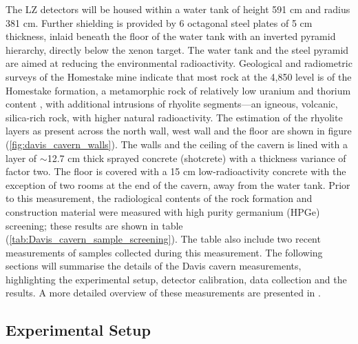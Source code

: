 The LZ detectors will be housed within a water tank of height 591 cm and radius 381 cm. Further shielding is provided by 6 octagonal steel plates of 5 cm thickness, inlaid beneath the floor of the water tank with an inverted pyramid hierarchy, directly below the xenon target. The water tank and the steel pyramid are aimed at reducing the environmental radioactivity. Geological and radiometric surveys of the Homestake mine indicate that most rock at the 4,850 level is of the Homestake formation, a metamorphic rock of relatively low uranium and thorium content \cite{Heise_2015}, with additional intrusions of rhyolite segments---an igneous, volcanic, silica-rich rock, with higher natural radioactivity. The estimation of the rhyolite layers as present across the north wall, west wall and the floor are shown in figure (\ref{fig:davis_cavern_walls}). The walls and the ceiling of the cavern is lined with a layer of $\sim$12.7 cm thick sprayed concrete (shotcrete) with a thickness variance of factor two. The floor is covered with a 15 cm low-radioactivity concrete with the exception of two rooms at the end of the cavern, away from the water tank. Prior to this measurement, the radiological contents of the rock formation and construction material were measured with high purity germanium (HPGe) screening; these results are shown in table (\ref{tab:Davis_cavern_sample_screening}). The table also include two recent measurements of samples collected during this measurement. The following sections will summarise the details of the Davis cavern \gray{} measurements, highlighting the experimental setup, detector calibration, data collection and the results. A more detailed overview of these measurements are presented in \cite{Akerib_2020_gray_measurements}.




\subsection{Experimental Setup}
\label{secsec:experimental_setup}

